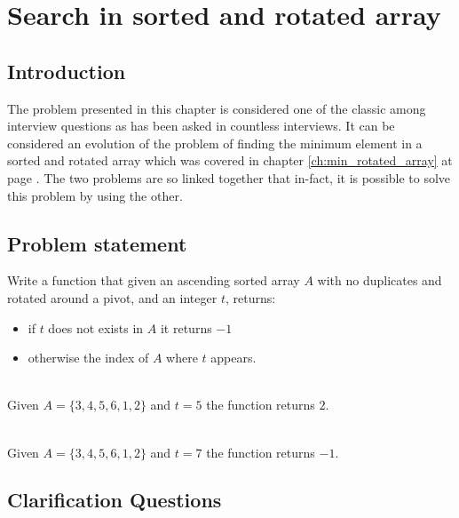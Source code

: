 %

\chapter{Search in sorted and rotated array}
\label{ch:search_sorted_rotated_array}
\section*{Introduction}
The problem presented in this chapter is considered one of the classic among interview questions as has been asked in countless interviews. It can be considered an evolution of the problem of finding the minimum element in a sorted and rotated array which was covered in chapter \ref{ch:min_rotated_array} at page \pageref{ch:min_rotated_array}. The two problems are so linked together that in-fact, it is possible to solve this problem by using the other. 

\section{Problem statement}
\begin{exercise}
Write a function that given an ascending sorted array $A$ with no duplicates and rotated around a pivot, and an integer $t$, returns:
\begin{itemize}
	\item if $t$ does not exists in $A$ it returns $-1$ 
	\item otherwise the index of $A$ where $t$ appears.
\end{itemize}


	\begin{example}
		\hfill \\
		Given $A=\{3,4,5,6,1,2\}$ and $t=5$ the function returns $2$.
		
	\end{example}

	\begin{example}
		\hfill \\
		Given $A=\{3,4,5,6,1,2\}$ and $t=7$ the function returns $-1$.
		
	\end{example}
\end{exercise}

\section{Clarification Questions}

